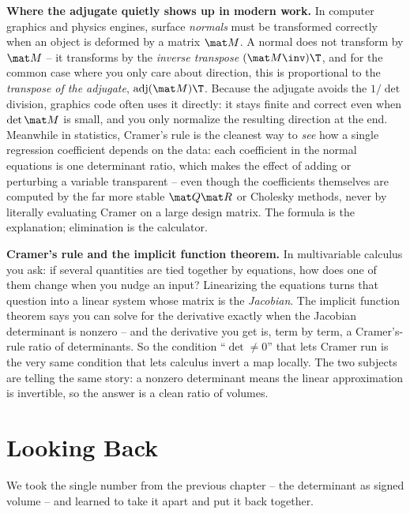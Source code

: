 \begin{applicationbox}
\textbf{Where the adjugate quietly shows up in modern work.} In computer graphics and physics
engines, surface \emph{normals} must be transformed correctly when an object is deformed by a matrix
$\mat M$. A normal does not transform by $\mat M$ -- it transforms by the \emph{inverse transpose}
$(\mat M\inv)\T$, and for the common case where you only care about direction, this is proportional to
the \emph{transpose of the adjugate}, $\operatorname{adj}(\mat M)\T$. Because the adjugate avoids the
$1/\det$ division, graphics code often uses it directly: it stays finite and correct even when $\det
\mat M$ is small, and you only normalize the resulting direction at the end. Meanwhile in statistics,
Cramer's rule is the cleanest way to \emph{see} how a single regression coefficient depends on the
data: each coefficient in the normal equations is one determinant ratio, which makes the effect of
adding or perturbing a variable transparent -- even though the coefficients themselves are computed by
the far more stable $\mat Q\mat R$ or Cholesky methods, never by literally evaluating Cramer on a
large design matrix. The formula is the explanation; elimination is the calculator.
\end{applicationbox}

\begin{connectionbox}
\textbf{Cramer's rule and the implicit function theorem.} In multivariable calculus you ask: if
several quantities are tied together by equations, how does one of them change when you nudge an
input? Linearizing the equations turns that question into a linear system whose matrix is the
\emph{Jacobian}. The implicit function theorem says you can solve for the derivative exactly when the
Jacobian determinant is nonzero -- and the derivative you get is, term by term, a Cramer's-rule ratio
of determinants. So the condition ``$\det\neq0$'' that lets Cramer run is the very same condition that
lets calculus invert a map locally. The two subjects are telling the same story: a nonzero determinant
means the linear approximation is invertible, so the answer is a clean ratio of volumes.
\end{connectionbox}

\section{Looking Back}

We took the single number from the previous chapter -- the determinant as signed volume -- and learned
to take it apart and put it back together.

